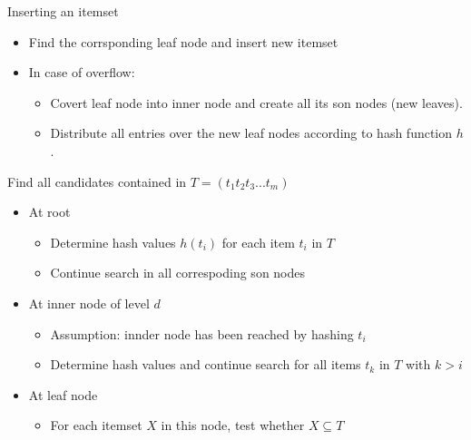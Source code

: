 \documentclass{article}
\begin{document}
Inserting an itemset 
\begin{itemize}
  \item Find the corrsponding leaf node and insert new itemset
  \item In case of overflow:
  \begin{itemize}
    \item Covert leaf node into inner node and create all its son nodes (new leaves).
    \item Distribute all entries over the new leaf nodes according to hash function $h$.
  \end{itemize}
\end{itemize}

\newpage

Find all candidates contained in $T = (t_1 t_2 t_3 ... t_m)$
\begin{itemize}
  \item At root
  \begin{itemize}
    \item Determine hash values $h(t_i)$ for each item $t_i$ in $T$
    \item Continue search in all correspoding son nodes
  \end{itemize}

  \item At inner node of level $d$
  \begin{itemize}
    \item Assumption: innder node has been reached by hashing $t_i$
    \item Determine hash values and continue search for all items $t_k$ in $T$ with $k > i$
  \end{itemize}

  \item At leaf node
  \begin{itemize}
    \item For each itemset $X$ in this node, test whether $X \subseteq T$
  \end{itemize}
\end{itemize}
\end{document}
